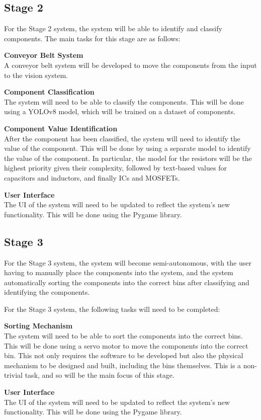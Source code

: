 \subsection{Stage 2}
For the Stage 2 system, the system will be able to identify and classify components. 
The main tasks for this stage are as follows:
\begin{mylist}
    \item \textbf{Conveyor Belt System} \\
    A conveyor belt system will be developed to move the components from the input to the vision system.
    \item \textbf{Component Classification} \\
    The system will need to be able to classify the components. This will be done using a YOLOv8 model, which will be trained on a dataset of components.
    \item \textbf{Component Value Identification} \\
    After the component has been classified, the system will need to identify the value of the component. This will be done by using
    a separate model to identify the value of the component. In particular, the model for the resistors will be the highest
    priority given their complexity, followed by text-based values for capacitors and inductors, and finally ICs and MOSFETs.
    \item \textbf{User Interface} \\
    The UI of the system will need to be updated to reflect the system's new functionality. This will be done using the Pygame library\cite{pygamedoc}.
\end{mylist}

\subsection{Stage 3}
For the Stage 3 system, the system will become semi-autonomous, with the user having to manually place the components into the system, and the system
automatically sorting the components into the correct bins after classifying and identifying the components. 

For the Stage 3 system, the following tasks will need to be completed:
\begin{mylist}
    \item \textbf{Sorting Mechanism} \\
    The system will need to be able to sort the components into the correct bins. This will be done using a servo motor to move the components into the correct bin.
    This not only requires the software to be developed but also the physical mechanism to be designed and built, including the bins themselves.
    This is a non-trivial task, and so will be the main focus of this stage.
    \item \textbf{User Interface} \\
    The UI of the system will need to be updated to reflect the system's new functionality. This will be done using the Pygame library\cite{pygamedoc}.
\end{mylist}

